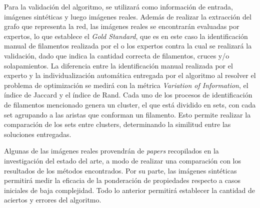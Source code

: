 \documentclass{article}
\begin{document}
Para la validaci\'on del algoritmo, se utilizar\'a como informaci\'on de entrada, im\'agenes sint\'eticas y luego im\'agenes reales. Adem\'as de realizar la extracci\'on del grafo que representa la red, las im\'agenes reales se encontrar\'an evaluadas por expertos, lo que establece el \textit{Gold Standard}, que es en este caso la identificaci\'on manual de filamentos realizada por el o los expertos contra la cual se realizar\'a la validaci\'on, dado que indica la cantidad correcta de filamentos, cruces y/o solapamientos.
La diferencia entre la identificaci\'on manual realizada por el experto y la individualizaci\'on autom\'atica entregada por el algoritmo al resolver el problema de optimizaci\'on se medir\'a con la m\'etrica {\it Variation of Information}\cite{meilua2007comparing}, el \'indice de Jaccard y el \'indice de Rand. Cada uno de los procesos de identificaci\'on de filamentos mencionado genera un cluster, el que est\'a dividido en sets, con cada set agrupando a las aristas que conforman un filamento. Esto permite realizar la comparaci\'on de los sets entre clusters, determinando la similitud entre las soluciones entregadas.

Algunas de las im\'agenes reales provendr\'an de {\it papers} recopilados en la investigaci\'on del estado del arte, a modo de realizar una comparaci\'on con los resultados de los m\'etodos encontrados. Por su parte, las im\'agenes sint\'eticas permitir\'a medir la eficacia de la ponderaci\'on de propiedades respecto a casos iniciales de baja complejidad. Todo lo anterior permitir\'a establecer la cantidad de aciertos y errores del algoritmo.




\end{document}
